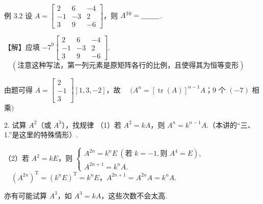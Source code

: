 \begin{fcard}{例 3.2}
设 $A=\begin{bmatrix}2&6&-4\\-1&-3&2\\3&9&-6\end{bmatrix}$，则 $A^{10}=\underline{\hspace{2.6em}}$.
\end{fcard}

【解】应填 $-7^9\begin{bmatrix}2&6&-4\\-1&-3&2\\3&9&-6\end{bmatrix}$.
$\quad(\text{注意这种写法，第一列元素是原矩阵各行的比例，且使得其为恒等变形})$

由题可得 $A=\begin{bmatrix}2\\-1\\3\end{bmatrix}[1,3,-2]$，故
$\quad(A^n=[\operatorname{tr}(A)]^{n-1}A$；9 个 $(-7)$ 相乘$)$


\begin{fkey}{2. 试算 $A^2$（或 $A^3$），找规律}
（1）若 $A^2=kA$，则 $A^n=k^{n-1}A$.（本讲的“三、1.”是这里的特殊情形）.

（2）若 $A^2=kE$，则 $\begin{cases}A^{2n}=k^nE\ (\text{若 }k=-1,\text{则 }A^4=E),\\A^{2n+1}=k^nA.\end{cases}$ $\quad(A^{2n})^{\mathrm T}=(k^nE)^{\mathrm T}=k^nE$，$A^{2n+1}=A^{2n}A=k^nA$.

亦有可能试算 $A^3$，如 $A^3=kA$，这些次数不会太高.
\end{fkey}

